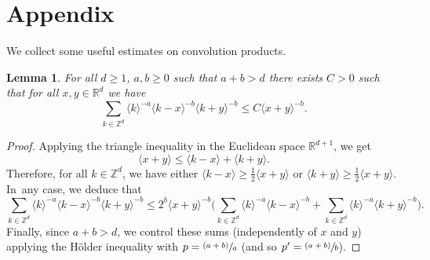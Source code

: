 \documentclass[11pt]{article}
\newcommand{\psfrac}[2]{\sfrac{(#1)}{#2}}
\newtheorem{lemma}[theorem]{Lemma}
\theoremstyle{definition}
\begin{document}
\section{Appendix}
We collect some useful estimates on convolution products.
\begin{lemma}
\label{lem_conv1}
For all $d\geq 1$, $a,b\geq 0$ such that $a+b>d$ there exists $C>0$ such that for all $x,y\in \mathbb{R}^d$ we have
\[
\sum_{k\in \mathbb{Z}^d} \langle k \rangle^{-a} \langle k-x \rangle^{-b} \langle k+ y\rangle^{-b} \leq C \langle x+y\rangle^{-b}.
\]
\end{lemma}
\begin{proof} Applying the triangle inequality in the Euclidean space $\mathbb{R}^{d+1}$, we get
\[
\langle x+y \rangle \leq \langle k-x \rangle + \langle k+ y\rangle.
\]
Therefore, for all $k\in \mathbb{Z}^d$, we have either $\langle k-x \rangle\geq \frac12 \langle x+y \rangle$ or $\langle k+y \rangle\geq \frac12 \langle x+y \rangle$. In~any case, we deduce that
\[
\sum_{k\in \mathbb{Z}^d} \langle k \rangle^{-a} \langle k-x \rangle^{-b} \langle k+ y\rangle^{-b} \leq 2^{b} \langle x+y\rangle^{-b} \biggl(\sum_{k\in \mathbb{Z}^d} \langle k \rangle^{-a} \langle k-x \rangle^{-b} + \sum_{k\in \mathbb{Z}^d} \langle k \rangle^{-a} \langle k+y \rangle^{-b} \biggr).
\]
Finally, since $a+b>d$, we control these sums (independently of $x$ and $y$) applying the Hölder inequality with $p = \psfrac{a+b}a$ (and so $p'= \psfrac{a+b}b$).
\end{proof}
\end{document}
